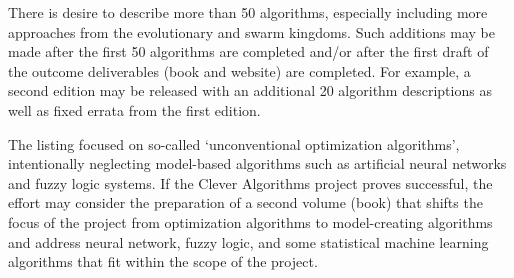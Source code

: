 \documentclass[a4paper, 11pt]{article}
\begin{document}
There is desire to describe more than 50 algorithms, especially including more approaches from the evolutionary and swarm kingdoms. Such additions may be made after the first 50 algorithms are completed and/or after the first draft of the outcome deliverables (book and website) are completed. For example, a second edition may be released with an additional 20 algorithm descriptions as well as fixed errata from the first edition.

The listing focused on so-called `unconventional optimization algorithms', intentionally neglecting model-based algorithms such as artificial neural networks and fuzzy logic systems. If the Clever Algorithms project proves successful, the effort may consider the preparation of a second volume (book) that shifts the focus of the project from optimization algorithms to model-creating algorithms and address neural network, fuzzy logic, and some statistical machine learning algorithms that fit within the scope of the project.



\end{document}
